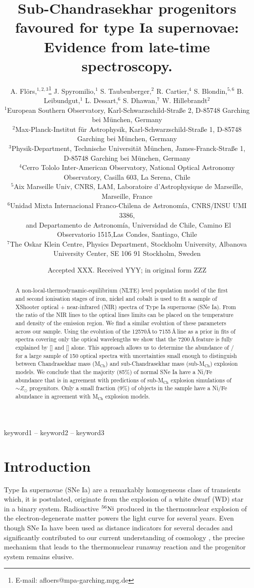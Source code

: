 \documentclass[fleqn,usenatbib]{mnras}
\title[Nickel and iron in SNe Ia]{%
Sub-Chandrasekhar progenitors favoured for type Ia supernovae: Evidence from late-time spectroscopy.
}
\author[A. Fl\"ors et al.]{
A. Fl\"ors,$^{1,2,3}$\thanks{E-mail: afloers@mpa-garching.mpg.de}
J. Spyromilio,$^{1}$
S. Taubenberger,$^{2}$
R. Cartier,$^{4}$
S. Blondin,$^{5,6}$
\newauthor
B. Leibundgut,$^{1}$
L. Dessart,$^{6}$
S. Dhawan,$^{7}$
W. Hillebrandt$^{2}$
\\
$^{1}$European Southern Observatory, Karl-Schwarzschild-Stra\ss e 2,
D-85748 Garching bei M\"unchen, Germany\\
$^{2}$Max-Planck-Institut f\"ur Astrophysik, Karl-Schwarzschild-Stra\ss e 1, D-85748 Garching bei M\"unchen, Germany\\
$^{3}$Physik-Department, Technische Universit\"at M\"unchen, James-Franck-Stra\ss e 1, D-85748 Garching bei M\"unchen, Germany\\
$^{4}$Cerro Tololo Inter-American Observatory, National Optical Astronomy Observatory, Casilla 603, La Serena, Chile\\
$^{5}$Aix Marseille Univ, CNRS, LAM, Laboratoire d’Astrophysique de Marseille, Marseille, France\\
$^{6}$Unidad Mixta Internacional Franco-Chilena de Astronom\'ia, CNRS/INSU UMI 3386, \\
$^{\,\,\,}$and Departamento de Astronom\'ia, Universidad de Chile, Camino El Observatorio 1515,Las Condes, Santiago, Chile\\
$^{7}$The Oskar Klein Centre, Physics Department, Stockholm University, Albanova University Center, SE 106 91 Stockholm, Sweden
}
\date{Accepted XXX. Received YYY; in original form ZZZ}
\begin{document}
\label{firstpage}
\pagerange{\pageref{firstpage}--\pageref{lastpage}}
\maketitle

\begin{abstract}
A non-local-thermodynamic-equilibrium (NLTE) level population model of the first and second ionisation stages of iron, nickel and cobalt is used to fit a sample of XShooter optical + near-infrared (NIR) spectra of Type Ia supernovae (SNe Ia). From the ratio of the NIR lines to the optical lines limits can be placed on the temperature and density of the emission region. We find a similar evolution of these parameters across our sample. Using the evolution of the  12570\AA\,to 7155\,\AA\,line as a prior in fits of spectra covering only the optical wavelengths we show that the 7200\,\AA\,feature is fully explained by [] and [] alone. This approach allows us to determine the abundance of / for a large sample of 150 optical spectra with uncertainties small enough to distinguish between Chandrasekhar mass (M$_{\text{Ch}}$) and sub-Chandrasekhar mass (sub-M$_{\text{Ch}}$) explosion models. We conclude that the majority (85\%) of normal SNe Ia have a Ni/Fe abundance that is in agreement with predictions of sub-M$_{\text{Ch}}$ explosion simulations of $\sim Z_\odot$ progenitors. Only a small fraction (9\%) of objects in the sample have a Ni/Fe abundance in agreement with M$_{\text{Ch}}$ explosion models.
\end{abstract}

\begin{keywords}
keyword1 -- keyword2 -- keyword3
\end{keywords}



\section{Introduction}
Type Ia supernovae (SNe Ia) are a remarkably homogeneous class of transients which, it is postulated, originate from the explosion of a white dwarf (WD) star in a binary system. Radioactive \ensuremath{^{56}{\rm Ni}} produced in the thermonuclear explosion of the electron-degenerate matter \citep{1960ApJ...132..565H} powers the light curve \citep{1969ApJ...157..623C, 1994ApJ...426L..89K} for several years. Even though SNe Ia have been used as distance indicators for several decades and significantly contributed to our current understanding of cosmology \citep[$\Lambda$CDM and the accelerated expansion of the universe, ][]{1998AJ....116.1009R, 1999ApJ...517..565P}, the precise mechanism that leads to the thermonuclear runaway reaction and the progenitor system remains elusive. 
\end{document}
